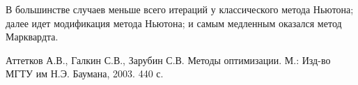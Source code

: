 \documentclass[12pt, a4paper]{article}
\begin{document}
В большинстве случаев меньше всего итераций у классического метода Ньютона; далее идет модификация метода Ньютона; и самым медленным оказался метод Марквардта.

\begin{thebibliography}{10}
 Аттетков А.В., Галкин С.В., Зарубин С.В. Методы оптимизации. М.: Изд-во МГТУ им Н.Э. Баумана, 2003. 440 с.
\end{thebibliography}
\end{document}
